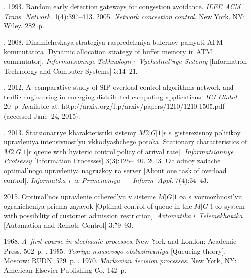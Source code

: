   \begin{multicols}{2}

\renewcommand{\bibname}{\protect\rmfamily References}

{\small\frenchspacing
 {%
 \begin{thebibliography}{99}

. 1993.
Random early detection gateways for congestion avoidance.
\textit{IEEE ACM Trans. Network.} 1(4):397--413.
 2005. \textit{Network congestion control}.  New
York, NY: Wiley. 282~p.

. 2008. Dinamicheskaya strategiya
raspredeleniya bufernoy pamyati ATM kommutatora [Dynamic allocation strategy
of buffer memory in ATM commutator]. \textit{Informatsionnye Tekhnologii
i~Vychislitel'nye Sistemy} [Information Technology and Computer Systems] 3:14--21.

. 2012.
A~comparative study of SIP overload control algorithms network and traffic
engineering in emerging distributed computing applications.
\textit{IGI Global}. 20~p. Available at:
{\sf http://arxiv.org/ftp/arxiv/papers/1210/1210.1505.pdf} (accessed June~24, 2015).

.
2013. Sta\-tsi\-o\-nar\-nye kharakteristiki sistemy $M2\vert G\vert 1\vert r$
s~gisterezisnoy politikoy upravleniya intensivnost'yu vkhodyashchego
potoka [Stationary characteristics of $M2\vert G\vert 1\vert r$
queue with hysteric control policy of arrival rate].
\textit{Informatsionnye Protsessy} [Information Processes] 3(3):125--140.
 2013. Ob odnoy zadache optimal'nogo upravleniya
nagruzkoy na server  [About one task of overload control].
\textit{Informatika i~ee Primeneniya}~--- \textit{Inform. Appl}. 7(4):34--43.

 2015.
Optimal'noe upravlenie ochered'yu v sisteme $M\vert G\vert 1\vert \infty$
s~vozmozhnost'yu ogranicheniya priema zayavok [Optimal control of queue in the
$M\vert G\vert 1\vert \infty$ system with possibility of customer admission
restriction]. \textit{Avtomatika i~Telemekhanika} [Automation and Remote Control]
3:79--93.

 1968. \textit{A~first course in stochastic processes}.
New York and London: Academic Press. 502~p.
. 1995.
\textit{Teoriya massovogo obsluzhivaniya} [Queueing theory]. Moscow: RUDN. 529~p.
. 1970. \textit{Markovian decision processes}.
New York, NY: American Elsevier Publishing Co. 142~p.

\end{thebibliography}

 }
 }

\end{multicols}

